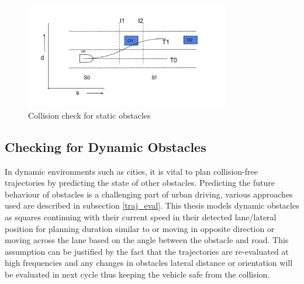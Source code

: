  \begin{figure}
    \centering
    \includegraphics[width=0.8\textwidth]{Images/static_check.png}
    \caption{Collision check for static obstacles}
    \label{static_check}
\end{figure}



\subsection{Checking for Dynamic Obstacles} \label{obstacle_check_dynamic}

In dynamic environments such as cities, it is vital to plan collision-free trajectories by predicting the state of other obstacles. Predicting the future behaviour of obstacles is a challenging part of urban driving, various approaches used are described in subsection \ref{traj_eval}. This thesis models dynamic obstacles as squares continuing with their current speed in their detected lane/lateral position for planning duration similar to \cite{unit_A_star} or moving in opposite direction or moving across the lane based on the angle between the obstacle and road. This assumption can be justified by the fact that the trajectories are re-evaluated at high frequencies and any changes in obstacles lateral distance or orientation will be evaluated in next cycle thus keeping the vehicle safe from the collision. 

